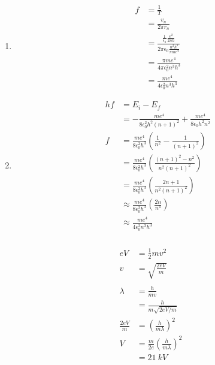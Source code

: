 \documentclass{article}
\begin{document}
\begin{enumerate}
  \item

        \begin{align*}
          f & = \frac{1}{T}                                                                               \\
            & = \frac{v_n}{2 \pi r_n}                                                                     \\
            & = \frac{\frac{1}{\epsilon_0} \frac{e^2}{2 n h}}{2 \pi \epsilon_0 \frac{n^2 h^2}{\pi m e^2}} \\
            & = \frac{\pi m e^4}{4 \pi \epsilon_0^2 n^3 h^3}                                              \\
            & = \frac{m e^4}{4 \epsilon_0^2 n^3 h^3}
        \end{align*}

  \item

        \begin{align*}
          h f & = E_i - E_f                                                                             \\
              & = -\frac{m e^4}{8 \epsilon_0^2 h^2 (n + 1)^2} + \frac{m e^4}{8 \epsilon_0 h^2 n^2}      \\
          f   & = \frac{m e^4}{8 \epsilon_0^2 h^3} \left( \frac{1}{n^2} - \frac{1}{(n + 1)^2} \right)   \\
              & = \frac{m e^4}{8 \epsilon_0^2 h^3} \left( \frac{(n + 1)^2 - n^2}{n^2 (n + 1)^2} \right) \\
              & = \frac{m e^4}{8 \epsilon_0^2 h^3} \left( \frac{2 n + 1}{n^2 (n + 1)^2} \right)         \\
              & \approx \frac{m e^4}{8 \epsilon_0^2 h^3} \left( \frac{2 n}{n^4} \right)                 \\
              & \approx \frac{m e^4}{4 \epsilon_0^2 n^3 h^3}
        \end{align*}
\end{enumerate}

\setcounter{subsubsection}{88}
\subsubsection{}

\begin{align*}
  e V             & = \frac{1}{2} m v^2                                  \\
  v               & = \sqrt{\frac{2 e V}{m}}                             \\ \\
  \lambda         & = \frac{h}{m v}                                      \\
                  & = \frac{h}{m \sqrt{2 e V / m}}                       \\
  \frac{2 e V}{m} & = \left( \frac{h}{m \lambda} \right)^2               \\
  V               & = \frac{m}{2 e} \left( \frac{h}{m \lambda} \right)^2 \\
                  & = \qty{21}{kV}
\end{align*}
\end{document}
